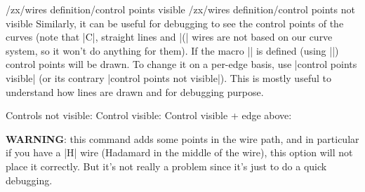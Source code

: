 \documentclass[a4paper]{ltxdoc}
\begin{document}
{\begin{pgfmanualentry}
  \def\extrakeytext{style, }
  \extractcommand\zxControlPointsVisible\@@
  \makeatletter%
  \extractkey/zx/wires definition/control points visible\@nil%
  \extractkey/zx/wires definition/control points not visible\@nil%
  \makeatother
  \pgfmanualbody
  Similarly, it can be useful for debugging to see the control points of the curves (note that |C|, straight lines and |(| wires are not based on our curve system, so it won't do anything for them). If the macro |\zxControlPointsVisible| is defined (using |\def\zxEdgesAbove{}|) control points will be drawn. To change it on a per-edge basis, use |control points visible| (or its contrary |control points not visible|). This is mostly useful to understand how lines are drawn and for debugging purpose.
\begin{codeexample}[]
  Controls not visible:
  \zx{\zxZ{\alpha+\beta} \ar[dr,s] \\
                         & \zxZ{\alpha+\beta}}
  Control visible:
  Control visible + edge above:
\end{codeexample}
\textbf{WARNING}: this command adds some points in the wire path, and in particular if you have a |H| wire (Hadamard in the middle of the wire), this option will not place it correctly. But it's not really a problem since it's just to do a quick debugging.
\end{pgfmanualentry}

}
\end{document}

